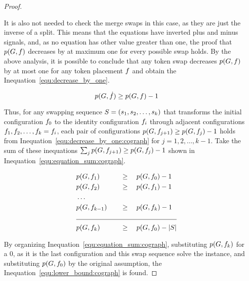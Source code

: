 \documentclass[msc]{ppgccufmg}    %
\begin{document}
\begin{proof}
\begin{itemize}
\end{itemize}

It is also not needed to check the merge swaps in this case, as they are just the inverse
of a split.
This means that the equations have inverted plus and minus signals, and, as no equation
has other value greater than one, the proof that $p(G, f)$
decreases by at maximum one for every possible swap holds.
By the above analysis, it is possible to conclude that any token swap decreases
$p(G, f)$ by at most one for any token placement $f$ and
obtain the Inequation~\ref{equ:decrease_by_one}.
    
\begin{equation}
    \centering
    \label{equ:decrease_by_one:cograph}
    \applyFunc{p}{\graphG, \sub{\mapFunc}} \geq \applyFunc{p}{\graphG, \mapFunc} - 1
\end{equation}

Thus, for any swapping sequence $S = (s_1, s_2, \ldots, 
s_k)$ that transforms the initial configuration $f_{0}$ to the identity
configuration $f_{i}$ through adjacent configurations $f_{1}, f_2,
\ldots, f_{k} = f_{i}$, each pair of configurations $p(G, 
f_{j+1}) \geq p(G, f_{j}) -1$ holds from 
Inequation~\ref{equ:decrease_by_one:cograph} for $j = 1,2,\ldots,k-1$.
Take the sum of these inequations $\sum_{j} p(G, f_{j+1}) \geq p(G, f_{j}) -1$ shown in Inequation~\ref{equ:equation_sum:cograph}.
    
\begin{alignat}{2}
\centering
\label{equ:equation_sum:cograph}
&\applyFunc{p}{\graphG, \mapFunc_{1}}  \quad && \geq \quad \applyFunc{p}{\graphG, \mapFunc_{0}} -1 \nonumber \\
&\applyFunc{p}{\graphG, \mapFunc_{2}} \quad && \geq \quad \applyFunc{p}{\graphG, \mapFunc_{1}} -1 \nonumber \\
&\ldots \nonumber \\
&\applyFunc{p}{\graphG, \mapFunc_{k-1}} \quad && \geq \quad \applyFunc{p}{\graphG, \mapFunc_{k}} -1 \nonumber \\
 \cline{1-4}
&\applyFunc{p}{\graphG, \mapFunc_{k}} \quad && \geq \quad \applyFunc{p}{\graphG, \mapFunc_{0}} - \sizeof{\swapSeq}
\end{alignat}
    
By organizing Inequation~\ref{equ:equation_sum:cograph}, substituting $p(G, 
f_{k})$ for a $0$, as it is the last configuration and this swap sequence solve the
instance, and substituting $p(G, f_{0})$ by the original assumption,
the Inequation~\ref{equ:lower_bound:cograph} is found.
    

\end{proof}
\end{document}
